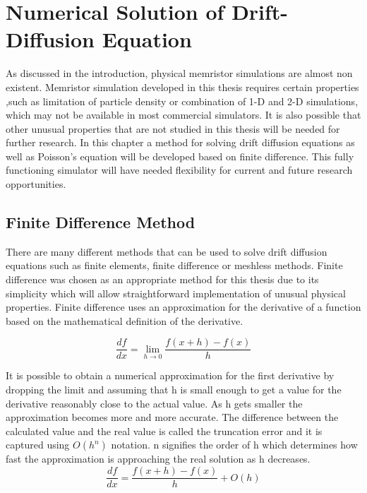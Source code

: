 

\chapter{Numerical Solution of Drift-Diffusion Equation} %

\label{Chapter3} %

\begin{doublespace}


As discussed in the introduction, physical memristor simulations are almost non existent. Memristor simulation developed in this thesis requires certain properties ,such as limitation of particle density or combination of 1-D and 2-D simulations, which may not be available in most commercial simulators. It is also possible that other unusual properties that are not studied in this thesis will be needed for further research. In this chapter a method for solving drift diffusion equations as well as Poisson's equation will be developed based on finite difference. This fully functioning simulator will have needed flexibility for current and future research opportunities.  


\section{Finite Difference Method}
There are many different methods that can be used to solve drift diffusion equations such as finite elements, finite difference or meshless methods. Finite difference was chosen as an appropriate method for this thesis due to its simplicity which will allow straightforward implementation of unusual physical properties. Finite difference uses an approximation for the derivative of a function based on the mathematical definition of the derivative.

\begin{equation}
\frac{df}{dx}=\lim\limits_{h \rightarrow 0} \frac{f(x+h)-f(x)}{h}
\end{equation}

It is possible to obtain a numerical approximation for the first derivative by dropping the limit and assuming that h is small enough to get a value for the derivative reasonably close to the actual value. As h gets smaller the approximation becomes more and more accurate. The difference between the calculated value and the real value is called the truncation error and it is captured using $O(h^n)$ notation. n signifies the order of h which determines how fast the approximation is approaching the real solution as h decreases.  
\begin{equation}
\frac{df}{dx}=\frac{f(x+h)-f(x)}{h} + O(h)
\label{numdif}
\end{equation}


\end{doublespace}
